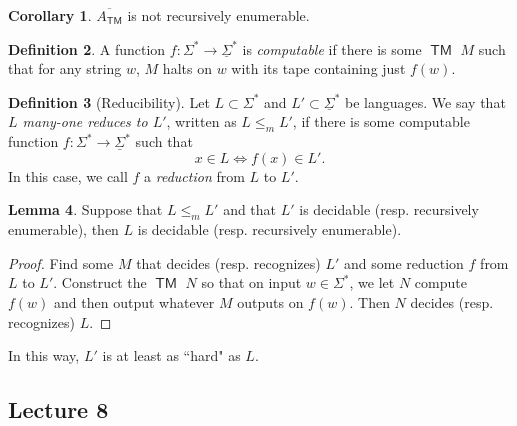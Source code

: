 \documentclass[10pt,letterpaper,cm]{nupset}
\theoremstyle{definition}
\newtheorem{definition}{Definition}[subsection]
\theoremstyle{theorem}
\newtheorem{lemma}[definition]{Lemma}
\newtheorem{corollary}[definition]{Corollary}
\theoremstyle{remark}
\newcommand{\1}{\mathbf{1}}
\newcommand{\0}{\vec 0}
\DeclareMathOperator{\TM}{\mathsf{TM}}
\begin{document}
\begin{corollary}
$\overline{A_{\TM}}$ is not recursively enumerable. 
\end{corollary}

\begin{definition}\label{computable}
A function $f: \Sigma^{\ast} \to \underline{\Sigma}^{\ast}$ is \textit{computable} if there is some $\TM$ $M$ such that for any string $w$, $M$ halts on $w$ with its tape containing just $f(w)$. 
\end{definition}

\begin{definition}[Reducibility]
Let $L\subset \Sigma^{\ast}$ and $L' \subset \underline{\Sigma}^{\ast}$ be languages. We say that \textit{$L$ many-one reduces to $L'$}, written as $L \leq_m L'$, if there is some computable function $f: \Sigma^{\ast} \to \underline{\Sigma}^{\ast}$ such that $$x\in L \iff f(x) \in L'.$$ In this case, we call $f$ a \textit{reduction} from $L$ to $L'$.
\end{definition}

\begin{lemma}
Suppose that $L \leq_m L'$ and that $L'$ is decidable (resp. recursively enumerable), then $L$ is decidable (resp. recursively enumerable).
\end{lemma}
\begin{proof}
Find some $M$ that decides (resp. recognizes) $L'$ and some reduction $f$ from $L$ to $L'$. Construct the $\TM$ $N$ so that on input $w\in \Sigma^{\ast}$, we let $N$ compute $f(w)$ and then output whatever $M$ outputs on $f(w)$. Then $N$ decides (resp. recognizes) $L$. 
\end{proof}

In this way, $L'$ is at least as ``hard" as $L$.

\subsection{Lecture 8}
\end{document}
